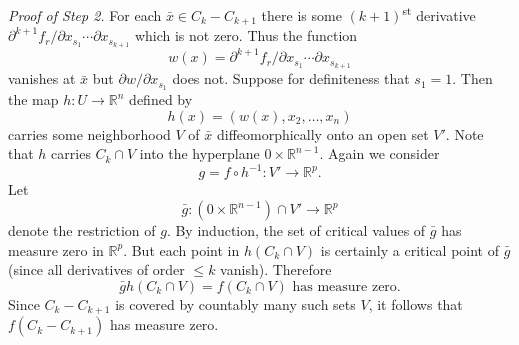 \noindent\textit{Proof of Step 2.} For each $\bar{x} \in C_k - C_{k+1}$ there is some $(k+1)$\textsuperscript{st} derivative $\partial^{k+1} f_r / \partial x_{s_1} \cdots \partial x_{s_{k+1}}$ which is not zero. Thus the function
\[
w(x) = \partial^{k+1} f_r / \partial x_{s_1} \cdots \partial x_{s_{k+1}}
\]
vanishes at $\bar{x}$ but $\partial w / \partial x_{s_1}$ does not. Suppose for definiteness that $s_1 = 1$. Then the map $h : U \to \mathbb{R}^n$ defined by
\[
h(x) = (w(x), x_2, \ldots, x_n)
\]
carries some neighborhood $V$ of $\bar{x}$ diffeomorphically onto an open set $V'$. Note that $h$ carries $C_k \cap V$ into the hyperplane $0 \times \mathbb{R}^{n-1}$. Again we consider
\[
g = f \circ h^{-1} : V' \to \mathbb{R}^p.
\]
Let
\[
\bar{g} : (0 \times \mathbb{R}^{n-1}) \cap V' \to \mathbb{R}^p
\]
denote the restriction of $g$. By induction, the set of critical values of $\bar{g}$ has measure zero in $\mathbb{R}^p$. But each point in $h(C_k \cap V)$ is certainly a critical point of $\bar{g}$ (since all derivatives of order $\leq k$ vanish). Therefore
\[
\bar{g}h(C_k \cap V) = f(C_k \cap V) \text{ has measure zero.}
\]
Since $C_k - C_{k+1}$ is covered by countably many such sets $V$, it follows that $f(C_k - C_{k+1})$ has measure zero.

